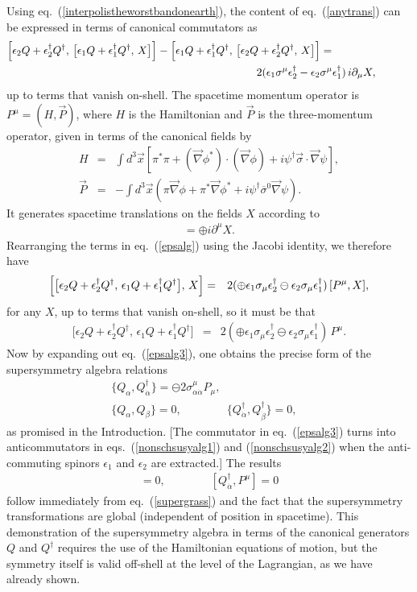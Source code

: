 \documentclass[11pt]{article}
\def\BDpos{}
\def\BDneg{-}
\def\BDplus{+}
\def\BDpos{-}
\def\BDneg{}
\def\BDplus{-}
\def\BDpos{\oplus}
\def\BDneg{\ominus}
\def\BDplus{\oplus}
\def\BDpos{\ominus}
\def\BDneg{\oplus}
\def\BDplus{\ominus}
\def\beq{\begin{eqnarray}}
\def\eeq{\end{eqnarray}}
\def\sigmabar{\overline\sigma}
\begin{document}
Using eq.~(\ref{interpolistheworstbandonearth}), the content of
eq.~(\ref{anytrans}) can be expressed in terms of canonical commutators as
\beq
\Bigl [
\epsilon_2 Q + \epsilon_2^\dagger Q^\dagger,\,
\bigl [
\epsilon_1 Q + \epsilon_1^\dagger Q^\dagger
,\, X
\bigr ] \Bigr ]
-
\Bigl [
\epsilon_1 Q + \epsilon_1^\dagger Q^\dagger,\,
\bigl [
\epsilon_2 Q + \epsilon_2^\dagger Q^\dagger
,\, X
\bigr ] \Bigr ]
=\qquad\qquad &&
\nonumber
\\
2( \epsilon_1 \sigma^\mu \epsilon_2^\dagger
  -\epsilon_2 \sigma^\mu \epsilon_1^\dagger)\, i\partial_\mu X
,&&
\qquad\>{}
\label{epsalg}
\eeq
up to terms that vanish on-shell. The spacetime momentum operator is
$P^\mu = (H, \vec{P})$, where $H$ is the Hamiltonian and $\vec{P}$ is the
three-momentum operator, given in terms of the canonical fields by
\beq
H &=& 
\int d^3\vec{x} \left [
\pi^*\pi + 
(\vec{\nabla} \phi^*)
\cdot (\vec{\nabla} \phi)
+ i \psi^\dagger \vec{\sigma} \cdot \vec{\nabla} \psi
\right ] ,
\\
\vec P &=& 
-\int d^3\vec{x} \left (
\pi \vec{\nabla} \phi 
+\pi^* \vec{\nabla} \phi^* 
+ i \psi^\dagger \sigmabar^0 \vec{\nabla} \psi 
\right )
.
\eeq 
It generates spacetime translations on the fields $X$ according to
\beq
[P^\mu, X ] = \BDneg i \partial^\mu X.
\label{supergrass}
\eeq
Rearranging the terms in eq.~(\ref{epsalg}) using the Jacobi identity,
we therefore have
\beq
\Bigl [ \bigl [
\epsilon_2 Q + \epsilon_2^\dagger Q^\dagger,\,
\epsilon_1 Q + \epsilon_1^\dagger Q^\dagger \bigr ]
,\, X
\Bigr ]
&= & 2(\BDneg\epsilon_1 \sigma_\mu \epsilon_2^\dagger
       \BDplus\epsilon_2 \sigma_\mu \epsilon_1^\dagger )\,  [ P^\mu , X ],
\label{epsalg2}
\eeq
for any $X$, up to terms that vanish on-shell, so it must be that
\beq
 \bigl [
\epsilon_2 Q + \epsilon_2^\dagger Q^\dagger,\,
\epsilon_1 Q + \epsilon_1^\dagger Q^\dagger \bigr ]
&= & 2(\BDneg\epsilon_1 \sigma_\mu \epsilon_2^\dagger
       \BDplus\epsilon_2 \sigma_\mu \epsilon_1^\dagger)\,  P^\mu  .
\label{epsalg3}
\eeq
Now by expanding out eq.~(\ref{epsalg3}), one obtains the precise form of
the supersymmetry algebra relations
\beq
&&\{ Q_\alpha , Q^\dagger_{\dot{\alpha}} \} =
\BDpos 2\sigma^\mu_{\alpha\dot{\alpha}} P_\mu,
\label{nonschsusyalg1}\\
&&\{ Q_\alpha, Q_\beta\} = 0
, \qquad\qquad
\{ Q^\dagger_{\dot{\alpha}}, Q^\dagger_{\dot{\beta}} \} = 0
,
\phantom{XXX}
\label{nonschsusyalg2}
\eeq
as promised in the Introduction. [The commutator in eq.~(\ref{epsalg3})
turns into anticommutators in eqs.~(\ref{nonschsusyalg1}) and
(\ref{nonschsusyalg2}) when the anti-commuting
spinors $\epsilon_1$ and $\epsilon_2$ are extracted.] The results
\beq
[Q_\alpha, P^\mu ] = 0, \qquad\qquad [Q^\dagger_{\dot{\alpha}},
P^\mu] = 0
\eeq
follow immediately from eq.~(\ref{supergrass}) and the fact that the
supersymmetry transformations are global (independent of position in
spacetime). This demonstration of the supersymmetry algebra in terms of
the canonical generators $Q$ and $Q^\dagger$ requires the use of the
Hamiltonian equations of motion, but the symmetry itself is valid
off-shell at the level of the Lagrangian, as we have already shown. 
\end{document}
